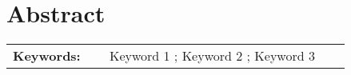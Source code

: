 \section*{Abstract}


\lipsum[2]


\vfill

\begin{tabular}{p{0.24\linewidth} p{0.6\linewidth}}
	\textbf{\Large Keywords:} & Keyword 1 ; Keyword 2 ; Keyword 3
\end{tabular}  \\